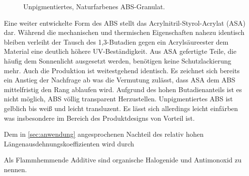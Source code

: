         \begin{figure}%
            \vspace{-\baselineskip}
            \caption[Unpigmentiertes, Naturfarbenes ABS-Granulat]{Unpigmentiertes, Naturfarbenes ABS-Granulat.}%
            \label{fig:virgin ABS}%
        \end{figure}
        Eine weiter entwickelte Form des ABS stellt das Acrylnitril-Styrol-Acrylat (ASA) dar. Während die mechanischen und
        thermischen Eigenschaften nahezu identisch bleiben verleiht der Tausch des 1,3-Butadien gegen ein Acrylsäureester
        dem Material eine deutlich höhere UV-Beständigkeit. Aus ASA gefertigte Teile, die häufig dem Sonnenlicht ausgesetzt
        werden, benötigen keine Schutzlackierung mehr. Auch die Produktion ist weitestgehend identisch. Es zeichnet sich
        bereits ein Anstieg der Nachfrage ab was die Vermutung zulässt, dass ASA dem ABS mittelfristig den Rang ablaufen wird.
        Aufgrund des hohen Butadienanteils ist es nicht möglich, ABS völlig transparent Herzustellen. Unpigmentiertes ABS
        ist gelblich bis weiß und leicht transluzent. Es lässt sich allerdings leicht einfärben was insbesondere im Bereich
        des Produktdesigns von Vorteil ist.\par

        Dem in \cref{sec:anwendung} angesprochenen Nachteil des relativ hohen Längenausdehnungskoeffizienten wird durch

        Als Flammhemmende Additive sind organische Halogenide und Antimonoxid zu nennen.